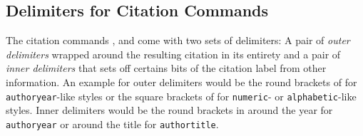 \documentclass[DIV=9]{scrartcl}
\def\sty{\texttt}
\begin{document}
\subsection{Delimiters for Citation Commands}
The citation commands ,  and  come with
two sets of delimiters: A pair of \emph{outer delimiters} wrapped around the
resulting citation in its entirety and a pair of \emph{inner delimiters} that
sets off certains bits of the citation label from other information.
An example for outer delimiters would be the round brackets of 
for \texttt{author\-year}-like styles or the square brackets of  for
\sty{numeric}- or \sty{alphabetic}-like styles.
Inner delimiters would be the round brackets in  around
the year for \sty{authoryear} or around the title for \sty{authortitle}.
\end{document}
